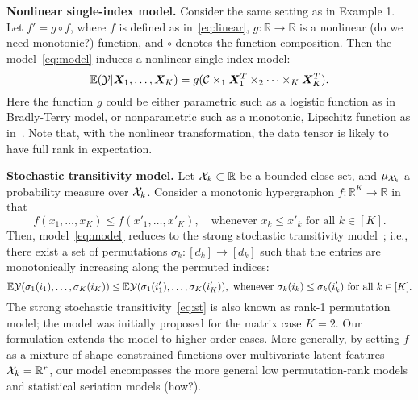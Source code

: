 \documentclass[11pt]{article}
\theoremstyle{plain}
\theoremstyle{definition}
\begin{document}
{\bf Nonlinear single-index model.} Consider the same setting as in Example 1. Let $f'=g\circ f$, where $f$ is defined as in~\eqref{eq:linear}, $g\colon \mathbb{R}\to\mathbb{R}$ is a nonlinear ({\color{red}do we need monotonic?}) function, and $\circ$ denotes the function composition. Then the model~\eqref{eq:model} induces a nonlinear single-index model:
\[
\mathbb{E}(\mathcal{Y}|\bm X_1,\ldots,\bm X_K)=g(\mathcal{C}\times_1\bm X_1^T\times_2\cdots\times_K\bm X^T_K).
\]
Here the function $g$ could be either parametric such as a logistic function as in Bradly-Terry model, or nonparametric such as a monotonic, Lipschitz function as in~\cite{ganti2015matrix}. Note that, with the nonlinear transformation, the data tensor is likely to have full rank in expectation. 


{\bf Stochastic transitivity model.} Let $\mathcal{X}_k\subset\mathbb{R}$ be a bounded close set, and $\mu_{\mathcal{X}_k}$ a probability measure over $\mathcal{X}_k$. Consider a monotonic hypergraphon $f\colon \mathbb{R}^K\to \mathbb{R}$ in that 
\[
f(x_1,\ldots,x_K)\leq f(x'_1,\ldots,x'_K), \quad \text{whenever }x_k\leq x'_k \text{ for all }k\in[K].
\]
 Then, model~\eqref{eq:model} reduces to the strong stochastic transitivity model~\cite{shah2019low,li2019nearest}; i.e., there exist a set of permutations $\sigma_k\colon[d_k]\to[d_k]$ such that the entries are monotonically increasing along the permuted indices:
\begin{equation}\label{eq:st}
\mathbb{E}\mathcal{Y}(\sigma_1(i_1),\ldots,\sigma_K(i_K)) \leq \mathbb{E}\mathcal{Y}(\sigma_1(i'_1),\ldots,\sigma_K(i'_K)),\ \text{whenever }\sigma_k(i_k)\leq \sigma_k(i'_k) \text{ for all } k\in[K]. 
\end{equation}
The strong stochastic transitivity~\eqref{eq:st} is also known as rank-1 permutation model; the model was initially proposed for the matrix case $K=2$. Our formulation extends the model to higher-order cases. More generally, by setting $f$ as a mixture of shape-constrained functions over multivariate latent features $\mathcal{X}_k=\mathbb{R}^r$, our model encompasses the more general low permutation-rank models and statistical seriation models ({\color{red}how?}). 
\end{document}
